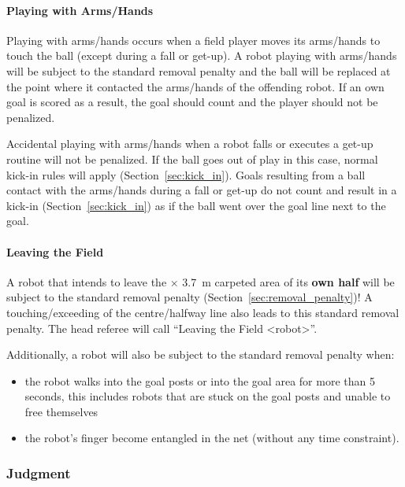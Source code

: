 \paragraph{Playing with Arms/Hands}
\label{sec:hand_ball}

Playing with arms/hands occurs when a field player moves its arms/hands to touch the ball (except during a fall or get-up). A robot playing with arms/hands will be subject to the standard removal penalty and the ball will be replaced at the point where it contacted the arms/hands of the offending robot. If an own goal is scored as a result, the goal should count and the player should not be penalized.

Accidental playing with arms/hands when a robot falls or executes a get-up routine will not be penalized. 
If the ball goes out of play in this case, normal kick-in rules will apply (\cf Section~\ref{sec:kick_in}). 
Goals resulting from a ball contact with the arms/hands during a fall or get-up do not count and result in a kick-in (\cf Section~\ref{sec:kick_in}) as if the ball went over the goal line next to the goal.

\paragraph{Leaving the Field}
\label{sec:leaving_field}

A robot that intends to leave the \TotalWidth $\times$ 3.7~m\xspace carpeted area of its \textbf{own half} will be subject to the standard removal penalty (\cf Section~\ref{sec:removal_penalty})! A touching/exceeding of the centre/halfway line also leads to this standard removal penalty. 
The head referee will call ``Leaving the Field \textless robot\textgreater''.

Additionally, a robot will also be subject to the standard removal penalty when:
\begin{itemize}
	\item the robot walks into the goal posts or into the goal area for more than 5 seconds, this includes robots that are stuck on the goal posts and unable to free themselves
	\item the robot's finger become entangled in the net (without any time constraint).
\end{itemize}

\subsubsection{Judgment}

